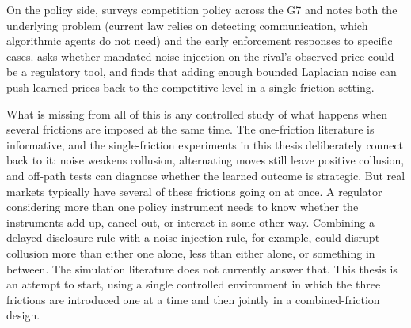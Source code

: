 On the policy side, \citet{oecd2025} surveys competition policy across the G7 and notes both the underlying problem (current law relies on detecting communication, which algorithmic agents do not need) and the early enforcement responses to specific cases. \citet{zhang2025} asks whether mandated noise injection on the rival's observed price could be a regulatory tool, and finds that adding enough bounded Laplacian noise can push learned prices back to the competitive level in a single friction setting.

What is missing from all of this is any controlled study of what happens when several frictions are imposed at the same time. The one-friction literature is informative, and the single-friction experiments in this thesis deliberately connect back to it: noise weakens collusion, alternating moves still leave positive collusion, and off-path tests can diagnose whether the learned outcome is strategic. But real markets typically have several of these frictions going on at once. A regulator considering more than one policy instrument needs to know whether the instruments add up, cancel out, or interact in some other way. Combining a delayed disclosure rule with a noise injection rule, for example, could disrupt collusion more than either one alone, less than either alone, or something in between. The simulation literature does not currently answer that. This thesis is an attempt to start, using a single controlled environment in which the three frictions are introduced one at a time and then jointly in a combined-friction design.
